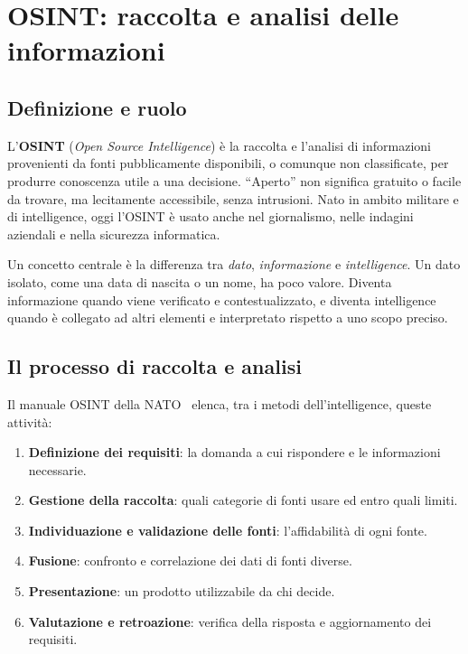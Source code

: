 \section{OSINT: raccolta e analisi delle informazioni}\label{sec:OSINT}

\subsection{Definizione e ruolo}

L'\textbf{OSINT} (\textit{Open Source Intelligence}) è la raccolta e l'analisi di informazioni provenienti da fonti pubblicamente disponibili, o comunque non classificate, per produrre conoscenza utile a una decisione. ``Aperto'' non significa gratuito o facile da trovare, ma lecitamente accessibile, senza intrusioni. Nato in ambito militare e di intelligence, oggi l'OSINT è usato anche nel giornalismo, nelle indagini aziendali e nella sicurezza informatica.

Un concetto centrale è la differenza tra \textit{dato}, \textit{informazione} e \textit{intelligence}. Un dato isolato, come una data di nascita o un nome, ha poco valore. Diventa informazione quando viene verificato e contestualizzato, e diventa intelligence quando è collegato ad altri elementi e interpretato rispetto a uno scopo preciso.

\subsection{Il processo di raccolta e analisi}

Il manuale OSINT della NATO~\cite{nato2001osint} elenca, tra i metodi dell'intelligence, queste attività:

\begin{enumerate}
    \item \textbf{Definizione dei requisiti}: la domanda a cui rispondere e le informazioni necessarie.
    \item \textbf{Gestione della raccolta}: quali categorie di fonti usare ed entro quali limiti.
    \item \textbf{Individuazione e validazione delle fonti}: l'affidabilità di ogni fonte.
    \item \textbf{Fusione}: confronto e correlazione dei dati di fonti diverse.
    \item \textbf{Presentazione}: un prodotto utilizzabile da chi decide.
    \item \textbf{Valutazione e retroazione}: verifica della risposta e aggiornamento dei requisiti.
\end{enumerate}


